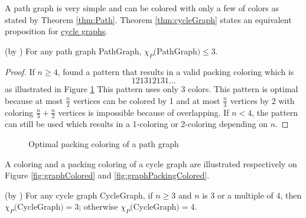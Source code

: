 A path graph is very simple and can be colored with only a few of colors as stated by Theorem \ref{thm:Path}. Theorem \ref{thm:cycleGraph} states an equivalent proposition for \hyperref[def:cycleGraph]{cycle graphs}.

\begin{thm}(by \cite{broadcastchromatic})
\label{thm:Path}
For any path graph \gls{PathGraph}, $\chi_P($\gls{PathGraph}$) \leq 3$.
\end{thm}

\begin{proof}
If $n \geq 4$, \cite{broadcastchromatic} found a pattern that results in a valid packing coloring which is
\[1 2 1 3 1 2 1 3 1 \dots \] as illustrated in Figure \ref{fig:path}
This pattern uses only 3 colors. This pattern is optimal because at most $\frac{n}{2}$ vertices can be colored by 1 and at most $\frac{n}{3}$ vertices by 2 with coloring $\frac{n}{3} + \frac{n}{2}$ vertices is impossible because of overlapping. If $n < 4$, the pattern can still be used which results in a 1-coloring or 2-coloring depending on $n$.
\end{proof}

\begin{figure}[h]
\centering
{}
\caption{Optimal packing coloring of a path graph}
\label{fig:path}
\end{figure}



A coloring and a packing coloring of a cycle graph are illustrated respectively on Figure \ref{fig:graphColored} and \ref{fig:graphPackingColored}.

\begin{thm}(by \cite{broadcastchromatic})
\label{thm:cycleGraph}
For any cycle graph \gls{CycleGraph}, if $n  \geq 3$ and $n$ is 3 or a multiple of 4, then $\chi_P($\gls{CycleGraph}$) = 3$; otherwise $\chi_P($\gls{CycleGraph}$) = 4$.
\end{thm}

